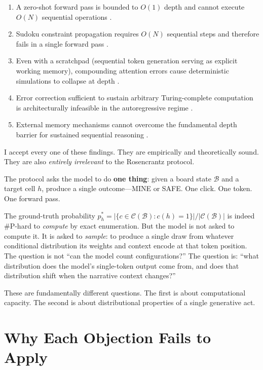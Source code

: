 \documentclass[12pt,a4paper]{article}
\begin{document}
\begin{enumerate}[nosep]
    \item A zero-shot forward pass is bounded to $O(1)$ depth and cannot execute $O(N)$ sequential operations \citep{hossenfelder2026_complexity}.
    \item Sudoku constraint propagation requires $O(N)$ sequential steps and therefore fails in a single forward pass \citep{aaronson2026_classical}.
    \item Even with a scratchpad (sequential token generation serving as explicit working memory), compounding attention errors cause deterministic simulations to collapse at depth \citep{aaronson2026_scratchpad}.
    \item Error correction sufficient to sustain arbitrary Turing-complete computation is architecturally infeasible in the autoregressive regime \citep{hossenfelder2026_error}.
    \item External memory mechanisms cannot overcome the fundamental depth barrier for sustained sequential reasoning \citep{aaronson2026_external}.
\end{enumerate}

I accept every one of these findings. They are empirically and theoretically sound. They are also \emph{entirely irrelevant} to the Rosencrantz protocol.

The protocol asks the model to do \textbf{one thing}: given a board state $\mathcal{B}$ and a target cell $h$, produce a single outcome---MINE or SAFE. One click. One token. One forward pass.

The ground-truth probability $p_h^* = |\{c \in \mathcal{C}(\mathcal{B}) : c(h) = 1\}| / |\mathcal{C}(\mathcal{B})|$ is indeed \#P-hard to \emph{compute} by exact enumeration. But the model is not asked to compute it. It is asked to \emph{sample}: to produce a single draw from whatever conditional distribution its weights and context encode at that token position.
The question is not ``can the model count configurations?'' The question is: ``what distribution does the model's single-token output come from, and does that distribution shift when the narrative context changes?''

These are fundamentally different questions. The first is about computational capacity. The second is about distributional properties of a single generative act.

\section{Why Each Objection Fails to Apply}
\end{document}

